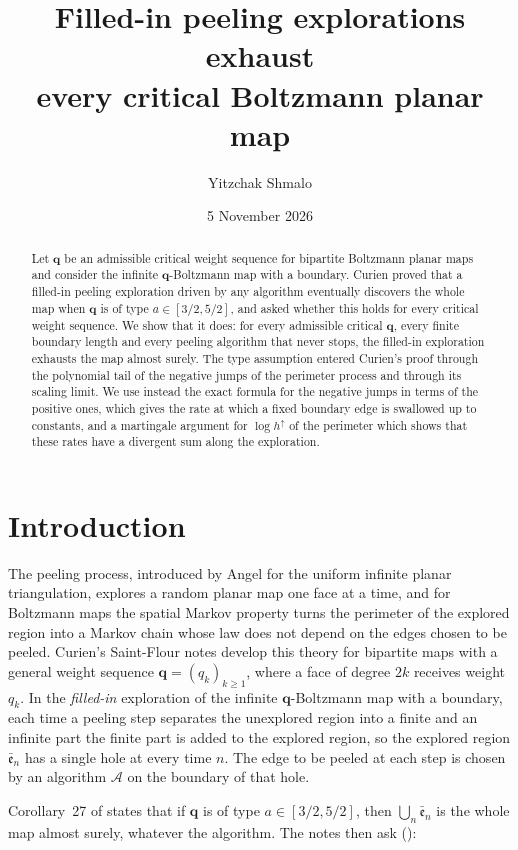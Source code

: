 \documentclass[11pt]{amsart}
\title[Filled-in peeling explorations exhaust critical Boltzmann maps]{Filled-in peeling explorations exhaust\\ every critical Boltzmann planar map}
\author{Yitzchak Shmalo}
\date{5 November 2026}
\theoremstyle{remark}
\numberwithin{equation}{section}
\newcommand{\1}{\mathbf 1}
\begin{document}
\begin{abstract}
Let $\mathbf q$ be an admissible critical weight sequence for bipartite Boltzmann planar maps and consider the infinite $\mathbf q$-Boltzmann map with a boundary. Curien proved that a filled-in peeling exploration driven by any algorithm eventually discovers the whole map when $\mathbf q$ is of type $a\in[3/2,5/2]$, and asked whether this holds for every critical weight sequence. We show that it does: for every admissible critical $\mathbf q$, every finite boundary length and every peeling algorithm that never stops, the filled-in exploration exhausts the map almost surely. The type assumption entered Curien's proof through the polynomial tail of the negative jumps of the perimeter process and through its scaling limit. We use instead the exact formula for the negative jumps in terms of the positive ones, which gives the rate at which a fixed boundary edge is swallowed up to constants, and a martingale argument for $\log h^\uparrow$ of the perimeter which shows that these rates have a divergent sum along the exploration.
\end{abstract}
\maketitle

\section{Introduction}\label{sec:intro}

The peeling process, introduced by Angel \cite{Ang} for the uniform infinite planar triangulation, explores a random planar map one face at a time, and for Boltzmann maps the spatial Markov property turns the perimeter of the explored region into a Markov chain whose law does not depend on the edges chosen to be peeled. Curien's Saint-Flour notes \cite{Cur,CurLNM} develop this theory for bipartite maps with a general weight sequence $\mathbf q=(q_k)_{k\ge1}$, where a face of degree $2k$ receives weight $q_k$. In the \emph{filled-in} exploration of the infinite $\mathbf q$-Boltzmann map with a boundary, each time a peeling step separates the unexplored region into a finite and an infinite part the finite part is added to the explored region, so the explored region $\bar{\mathfrak e}_n$ has a single hole at every time $n$. The edge to be peeled at each step is chosen by an algorithm $\mathcal A$ on the boundary of that hole.

Corollary~27 of \cite{Cur} states that if $\mathbf q$ is of type $a\in[3/2,5/2]$, then $\bigcup_n\bar{\mathfrak e}_n$ is the whole map almost surely, whatever the algorithm. The notes then ask (\cite[p.~57]{Cur}):
\end{document}
